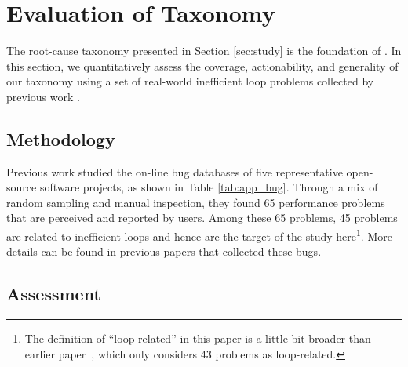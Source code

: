 \section{Evaluation of Taxonomy}
\label{sec:eval_taxonomy}




The root-cause taxonomy presented in Section \ref{sec:study} is the foundation
of \Tool. In this section,
we quantitatively 
assess the coverage, actionability, and generality of our taxonomy using
a set of
real-world inefficient loop problems collected by previous work
\cite{SongOOPSLA2014,PerfBug}.


\subsection{Methodology}

Previous work \cite{PerfBug,SongOOPSLA2014} studied the on-line bug
databases of five representative open-source software projects, as 
shown in Table \ref{tab:app_bug}. Through a mix of random sampling and 
manual inspection, they 
found 65 performance problems that are perceived and reported by users. 
Among these 65 problems, 45 problems are related to inefficient loops and 
hence are the target of the study 
here\footnote{The definition of ``loop-related'' in this paper is a little
bit broader than earlier paper~\cite{SongOOPSLA2014}, which only considers
43 problems as loop-related. }.
More details can be found in previous papers that collected
these bugs. 

\subsection{Assessment}
\label{sec:study_ob}

